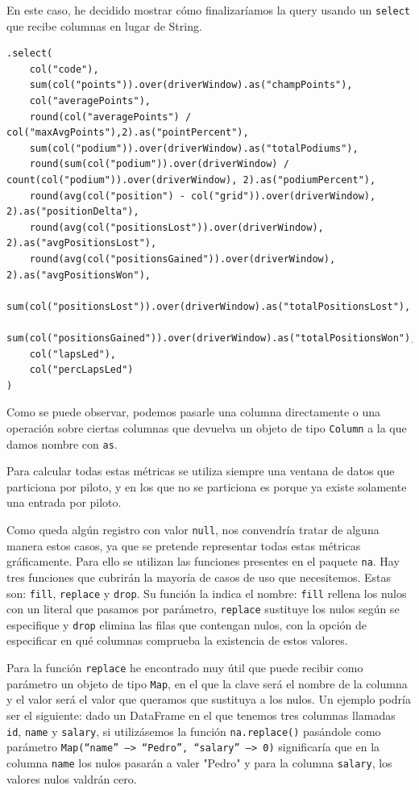 \documentclass[12pt,twoside,titlepage]{report}
\newcommand{\quotes}[1]{``#1''}
\begin{document}
En este caso, he decidido mostrar cómo finalizaríamos la query usando un \texttt{select} que recibe columnas en lugar de String. 

\begin{lstlisting}
.select(
	col("code"),
	sum(col("points")).over(driverWindow).as("champPoints"),
	col("averagePoints"),
	round(col("averagePoints") / col("maxAvgPoints"),2).as("pointPercent"),
	sum(col("podium")).over(driverWindow).as("totalPodiums"),
	round(sum(col("podium")).over(driverWindow) / count(col("podium")).over(driverWindow), 2).as("podiumPercent"),
	round(avg(col("position") - col("grid")).over(driverWindow), 2).as("positionDelta"),
	round(avg(col("positionsLost")).over(driverWindow), 2).as("avgPositionsLost"),
	round(avg(col("positionsGained")).over(driverWindow), 2).as("avgPositionsWon"),
	sum(col("positionsLost")).over(driverWindow).as("totalPositionsLost"),
	sum(col("positionsGained")).over(driverWindow).as("totalPositionsWon"),
	col("lapsLed"),
	col("percLapsLed")
)
\end{lstlisting}

Como se puede observar, podemos pasarle una columna directamente o una operación sobre ciertas columnas que devuelva un objeto de tipo \texttt{Column} a la que damos nombre con \texttt{as}.

Para calcular todas estas métricas se utiliza siempre una ventana de datos que particiona por piloto, y en los que no se particiona es porque ya existe solamente una entrada por piloto.

Como queda algún registro con valor \texttt{null}, nos convendría tratar de alguna manera estos casos, ya que se pretende representar todas estas métricas gráficamente. Para ello se utilizan las funciones presentes en el paquete \texttt{na}. Hay tres funciones que cubrirán la mayoría de casos de uso que necesitemos. Estas son: \texttt{fill}, \texttt{replace} y \texttt{drop}. Su función la indica el nombre: \texttt{fill} rellena los nulos con un literal que pasamos por parámetro, \texttt{replace} sustituye los nulos según se especifique y \texttt{drop} elimina las filas que contengan nulos, con la opción de especificar en qué columnas comprueba la existencia de estos valores.

Para la función \texttt{replace} he encontrado muy útil que puede recibir como parámetro un objeto de tipo \texttt{Map}, en el que la clave será el nombre de la columna y el valor será el valor que queramos que sustituya a los nulos. Un ejemplo podría ser el siguiente: dado un DataFrame en el que tenemos tres columnas llamadas \texttt{id}, \texttt{name} y \texttt{salary}, si utilizásemos la función \texttt{na.replace()} pasándole como parámetro \texttt{Map(\quotes{name} --> \quotes{Pedro}, \quotes{salary} --> 0)} significaría que en la columna \texttt{name} los nulos pasarán a valer "Pedro" y para la columna \texttt{salary}, los valores nulos valdrán cero.
\end{document}
